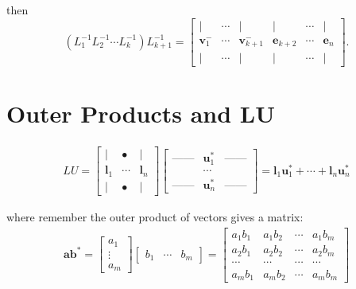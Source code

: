 \documentclass[12pt]{article}
\theoremstyle{definition}
\begin{document}
 then
 \begin{equation}
(L_1^{-1}L_2^{-1}\cdots L_{k}^{-1})L_{k+1}^{-1}=
\begin{bmatrix}
| & \cdots & | & | & \cdots & | \\ 
\mathbf{v}_1^- & \cdots & \mathbf{v}_{k+1}^{-} & \mathbf{e}_{k+2} & \cdots & \mathbf{e}_n \\ 
| & \cdots & | & | & \cdots & |
\end{bmatrix}.
 \end{equation}


 
 
\section{Outer Products and LU}

\begin{align}\label{we_want}
LU=\begin{bmatrix}
| & • & | \\ 
\mathbf{l}_1 & \cdots & \mathbf{l}_n \\ 
| & • & |
\end{bmatrix} 
\begin{bmatrix}
\text{---}\text{---} & \mathbf{u}_1^*& \text{---}\text{---} \\ 
  & \cdots &  \\ 
\text{---}\text{---} & \mathbf{u}_n^*& \text{---}\text{---}
\end{bmatrix} 
=\mathbf{l}_1 \mathbf{u}_1^*+\cdots + \mathbf{l}_n \mathbf{u}_n^*
\end{align}

where remember the outer product of vectors gives a matrix:
\begin{align}\label{outer_product}
\mathbf{a} \mathbf{b}^*=\begin{bmatrix}
a_1 \\ 
\vdots \\ 
a_m
\end{bmatrix} 
\begin{bmatrix}
b_1 & \cdots & b_m 
\end{bmatrix} 
=\begin{bmatrix}
a_1 b_1 & a_1 b_2 & \cdots & a_1 b_m \\ 
a_2 b_1 & a_2 b_2 & \cdots & a_2 b_m \\ 
\cdots & \cdots & \cdots & \cdots \\ 
a_m b_1 & a_m b_2 & \cdots & a_m b_m
\end{bmatrix} 
\end{align}
\end{document}
